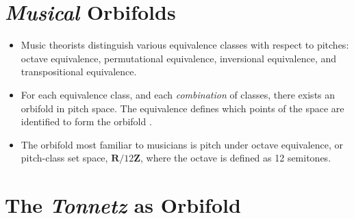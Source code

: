\documentclass[14pt,letterpaper,onecolumn]{scrartcl}
\begin{document}
\section{\emph{Musical} Orbifolds}

\begin{itemize}

\item Music theorists distinguish various equivalence classes with respect to pitches: octave equivalence, permutational equivalence, inversional equivalence, and transpositional equivalence.

\item For each equivalence class, and each \emph{combination} of classes, there exists an orbifold in pitch space. The equivalence defines which points of the space are identified to form the orbifold \cite{generalizedchordspaces}. 

\item The orbifold most familiar to musicians is pitch under octave equivalence, or pitch-class set space, $\textbf{R}/12\textbf{Z}$, where the octave is defined as 12 semitones.
	
\end{itemize}

\section{The \emph{Tonnetz} as Orbifold}
\end{document}
